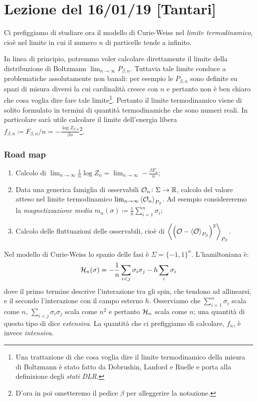 \section{Lezione del 16/01/19 [Tantari]}
Ci prefiggiamo di studiare ora il modello di Curie-Weiss nel \emph{limite termodinamico}, cioè nel limite in cui il numero $ n $ di particelle tende a infinito.

In linea di principio, potremmo voler calcolare direttamente il limite della distribuzione di Boltzmann $ \lim_{n \to \infty} P_{\beta, n} $. Tuttavia tale limite conduce a problematiche assolutamente non banali: per esempio le $ P_{\beta, n} $ sono definite su spazi di misura diversi la cui cardinalità cresce con $ n $ e pertanto non è ben chiaro che cosa voglia dire fare tale limite\footnote{Una trattazione di che cosa voglia dire il limite termodinamico della misura di Boltzmann è stato fatto da Dobrushin, Lanford e Ruelle e porta alla definizione degli \emph{stati DLR}.}. Pertanto il limite termodinamico viene di solito formulato in termini di quantità termodinamiche che sono numeri reali. In particolare sarà utile calcolare il limite dell'energia libera $ f_{\beta, n} \coloneqq F_{\beta, n}/n = -\frac{\log Z_{\beta, n}}{\beta n}$\footnote{D'ora in poi ometteremo il pedice $ \beta $ per alleggerire la notazione.}.

\subsubsection{Road map}
\begin{enumerate}
    \item Calcolo di $ \lim_{n\to\infty} \frac{1}{n} \log{Z_n} = \lim_{n\to\infty} -\frac{\beta F_n}{n} $;
    \item Data una generica famiglia di osservabili $ \mathcal{O}_n\colon\Sigma\to\mathbb{R} $, calcolo del valore atteso nel limite termodinamico $ \lim_{n\to\infty} \left< \mathcal{O}_n \right>_{P_\beta} $. Ad esempio considereremo la \emph{magnetizzazione media} $ m_n(\sigma) \coloneqq \frac{1}{n}\sum_{i=1}^{n}\sigma_i $;
    \item Calcolo delle fluttuazioni delle osservabili, cioè di $ \left<  \left(\mathcal{O} - \left< \mathcal{O} \right>_{P_\beta} \right)^2  \right>_{P_\beta} $.
\end{enumerate}

Nel modello di Curie-Weiss lo spazio delle fasi è $ \Sigma = \{-1,1\}^n $. L'hamiltoniana è:
\begin{equation}
    \mathcal{H}_n(\sigma) = -\frac{1}{n} \sum_{i<j} \sigma_i \sigma_j - h \sum_i \sigma_i
\end{equation}
dove il primo termine descrive l'interazione tra gli spin, che tendono ad allinearsi, e il secondo l'interazione con il campo esterno $ h $. Osserviamo che $ \sum_{i=1}^{n} \sigma_i $ scala come $ n $, $ \sum_{i<j} \sigma_i \sigma_j $ scala come $ n^2 $  e pertanto $ \mathcal{H}_n $ scala come $ n $; una quantità di questo tipo di dice \emph{estensiva}. La quantità che ci prefiggiamo di calcolare, $ f_n $, è invece \emph{intensiva}.

